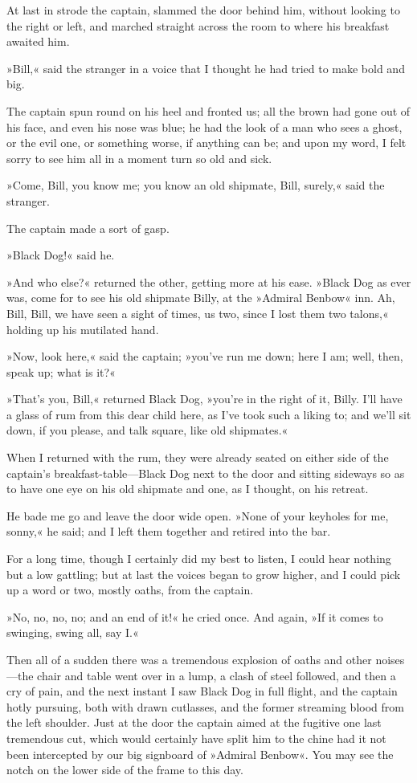 At last in strode the captain, slammed the door behind him, without looking to the right or left, and marched straight across the room to where his breakfast awaited him.

»Bill,« said the stranger in a voice that I thought he had tried to make bold and big.

The captain spun round on his heel and fronted us; all the brown had gone out of his face, and even his nose was blue; he had the look of a man who sees a ghost, or the evil one, or something worse, if anything can be; and upon my word, I felt sorry to see him all in a moment turn so old and sick.

»Come, Bill, you know me; you know an old shipmate, Bill, surely,« said the stranger.

The captain made a sort of gasp.

»Black Dog!« said he.

»And who else?« returned the other, getting more at his ease. »Black Dog as ever was, come for to see his old shipmate Billy, at the »Admiral Benbow« inn. Ah, Bill, Bill, we have seen a sight of times, us two, since I lost them two talons,« holding up his mutilated hand.

»Now, look here,« said the captain; »you've run me down; here I am; well, then, speak up; what is it?«

»That's you, Bill,« returned Black Dog, »you're in the right of it, Billy. I'll have a glass of rum from this dear child here, as I've took such a liking to; and we'll sit down, if you please, and talk square, like old shipmates.«

When I returned with the rum, they were already seated on either side of the captain's breakfast-table—Black Dog next to the door and sitting sideways so as to have one eye on his old shipmate and one, as I thought, on his retreat.

He bade me go and leave the door wide open. »None of your keyholes for me, sonny,« he said; and I left them together and retired into the bar.

For a long time, though I certainly did my best to listen, I could hear nothing but a low gattling; but at last the voices began to grow higher, and I could pick up a word or two, mostly oaths, from the captain.

»No, no, no, no; and an end of it!« he cried once. And again, »If it comes to swinging, swing all, say I.«

 

Then all of a sudden there was a tremendous explosion of oaths and other noises—the chair and table went over in a lump, a clash of steel followed, and then a cry of pain, and the next instant I saw Black Dog in full flight, and the captain hotly pursuing, both with drawn cutlasses, and the former streaming blood from the left shoulder. Just at the door the captain aimed at the fugitive one last tremendous cut, which would certainly have split him to the chine had it not been intercepted by our big signboard of »Admiral Benbow«. You may see the notch on the lower side of the frame to this day.

